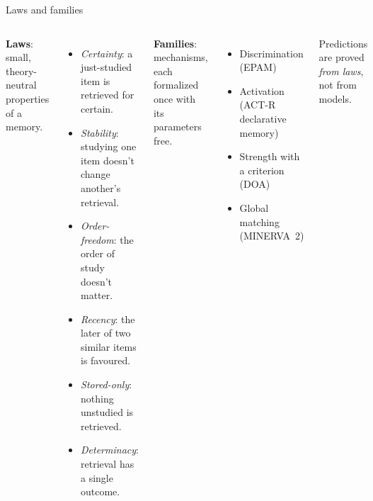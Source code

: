 \documentclass[aspectratio=169,11pt]{beamer}
\begin{document}
\begin{frame}{Laws and families}
  \begin{columns}[T]
    \textbf{Laws}: small, theory-neutral properties of a memory.
    \begin{itemize}\small
      \item \emph{Certainty}: a just-studied item is retrieved for certain.
      \item \emph{Stability}: studying one item doesn't change another's retrieval.
      \item \emph{Order-freedom}: the order of study doesn't matter.
      \item \emph{Recency}: the later of two similar items is favoured.
      \item \emph{Stored-only}: nothing unstudied is retrieved.
      \item \emph{Determinacy}: retrieval has a single outcome.
    \end{itemize}
    \textbf{Families}: mechanisms, each formalized once with its parameters free.
    \begin{itemize}\small
      \item Discrimination (EPAM)
      \item Activation (ACT-R declarative memory)
      \item Strength with a criterion (DOA)
      \item Global matching (MINERVA~2)
    \end{itemize}
    \bigskip
    Predictions are proved \emph{from laws}, not from models.
  \end{columns}
\end{frame}
\end{document}
